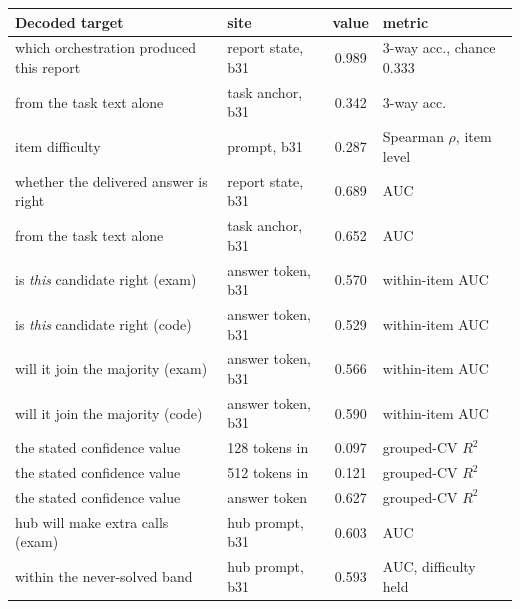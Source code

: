 \begin{tabular}{llcl}
\toprule
Decoded target & site & value & metric \\
\midrule
which orchestration produced this report & report state, b31 & 0.989 & 3-way acc., chance 0.333 \\
\quad from the task text alone & task anchor, b31 & 0.342 & 3-way acc. \\
item difficulty & prompt, b31 & 0.287 & Spearman $\rho$, item level \\
whether the delivered answer is right & report state, b31 & 0.689 & AUC \\
\quad from the task text alone & task anchor, b31 & 0.652 & AUC \\
is \emph{this} candidate right (exam) & answer token, b31 & 0.570 & within-item AUC \\
is \emph{this} candidate right (code) & answer token, b31 & 0.529 & within-item AUC \\
will it join the majority (exam) & answer token, b31 & 0.566 & within-item AUC \\
will it join the majority (code) & answer token, b31 & 0.590 & within-item AUC \\
the stated confidence value & 128 tokens in & 0.097 & grouped-CV $R^2$ \\
the stated confidence value & 512 tokens in & 0.121 & grouped-CV $R^2$ \\
the stated confidence value & answer token & 0.627 & grouped-CV $R^2$ \\
hub will make extra calls (exam) & hub prompt, b31 & 0.603 & AUC \\
\quad within the never-solved band & hub prompt, b31 & 0.593 & AUC, difficulty held \\
\bottomrule
\end{tabular}